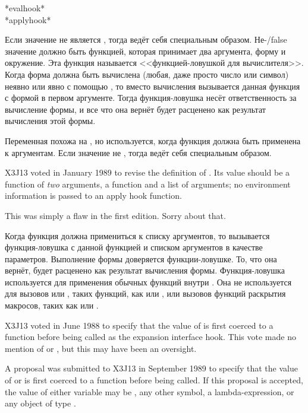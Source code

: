 \begin{defun}[Переменная]
*evalhook* \\
*applyhook*

Если значение  не является {\false}, тогда  ведёт себя
специальным образом. Не-{/false} значение  должно быть функцией,
которая принимает два аргумента, форму и окружение.
Эта функция называется <<функцией-ловушкой для вычислителя>>.
Когда форма должна быть вычислена (любая, даже просто число или символ) неявно или явно с
помощью , то вместо вычисления вызывается данная функция с формой в
первом аргументе.
Тогда функция-ловушка несёт ответственность за вычисление формы, и все что она
вернёт будет расценено как результат вычисления этой формы.

Переменная  похожа на , но используется, когда
функция должна быть применена к аргументам.
Если значение  не {\false}, тогда  ведёт себя
специальным образом.

\begin{new}
X3J13 voted in January 1989
to revise the definition of .
Its value should be a function of \emph{two} arguments,
a function and a list of arguments; no environment information is passed
to an apply hook function.

This was simply a flaw in the first edition.  Sorry about that.
\end{new}

Когда функция должна примениться к списку аргументов, то вызывается
функция-ловушка с данной функцией и списком аргументов в качестве параметров.
Выполнение формы доверяется функции-ловушке. То, что она вернёт, будет расценено
как результат вычисления формы.
Функция-ловушка используется для применения обычных функций внутри
. Она не используется для вызовов  или
, таких функций, как  или , или
вызовов функций раскрытия макросов, таких как  или .

\begin{newer}
X3J13 voted in June 1988  to specify
that the value of  is first coerced to a
function before being called as the expansion interface hook.
This vote made no mention of  or ,
but this may have been an oversight.

A proposal was submitted to X3J13 in September 1989 to specify
that the value of  or  is first coerced to a
function before being called.  If this proposal is accepted,
the value of either variable may be , any other symbol,
a lambda-expression, or any object of type .
\end{newer}


\end{defun}
